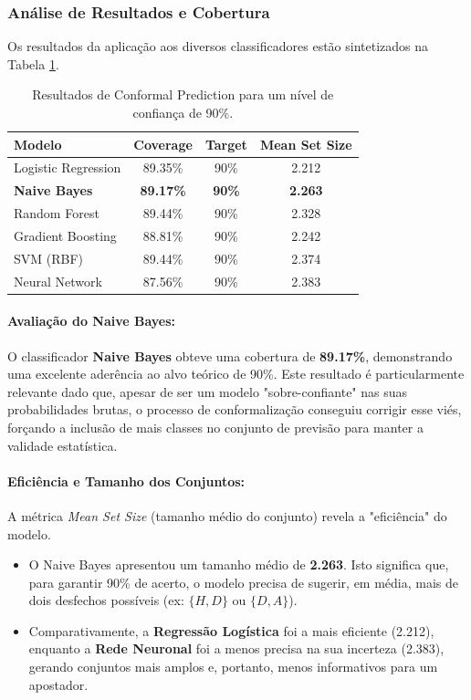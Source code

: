 \documentclass[10pt]{article}
\begin{document}
\subsubsection{Análise de Resultados e Cobertura}
Os resultados da aplicação aos diversos classificadores estão sintetizados na Tabela \ref{tab:conformal_results}.

\begin{table}[H]
\centering
\begin{tabular}{lccc}
\hline
\textbf{Modelo} & \textbf{Coverage} & \textbf{Target} & \textbf{Mean Set Size} \\ \hline
Logistic Regression & 89.35\% & 90\% & 2.212 \\
\textbf{Naive Bayes} & \textbf{89.17\%} & \textbf{90\%} & \textbf{2.263} \\
Random Forest & 89.44\% & 90\% & 2.328 \\
Gradient Boosting & 88.81\% & 90\% & 2.242 \\
SVM (RBF) & 89.44\% & 90\% & 2.374 \\
Neural Network & 87.56\% & 90\% & 2.383 \\ \hline
\end{tabular}
\caption{Resultados de Conformal Prediction para um nível de confiança de 90\%.}
\label{tab:conformal_results}
\end{table}

\paragraph{Avaliação do Naive Bayes:}
O classificador \textbf{Naive Bayes} obteve uma cobertura de \textbf{89.17\%}, demonstrando uma excelente aderência ao alvo teórico de 90\%. Este resultado é particularmente relevante dado que, apesar de ser um modelo "sobre-confiante" nas suas probabilidades brutas, o processo de conformalização conseguiu corrigir esse viés, forçando a inclusão de mais classes no conjunto de previsão para manter a validade estatística.

\paragraph{Eficiência e Tamanho dos Conjuntos:}
A métrica \textit{Mean Set Size} (tamanho médio do conjunto) revela a "eficiência" do modelo. 
\begin{itemize}
    \item O Naive Bayes apresentou um tamanho médio de \textbf{2.263}. Isto significa que, para garantir 90\% de acerto, o modelo precisa de sugerir, em média, mais de dois desfechos possíveis (ex: $\{H, D\}$ ou $\{D, A\}$).
    \item Comparativamente, a \textbf{Regressão Logística} foi a mais eficiente (2.212), enquanto a \textbf{Rede Neuronal} foi a menos precisa na sua incerteza (2.383), gerando conjuntos mais amplos e, portanto, menos informativos para um apostador.
\end{itemize}
\end{document}
